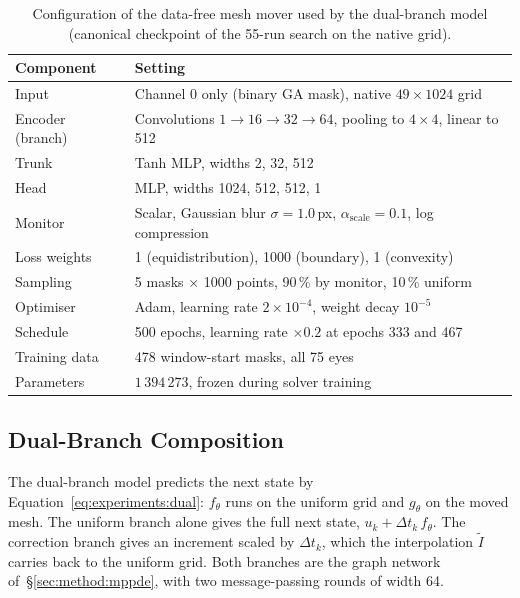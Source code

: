 \begin{table}[t]
  \centering
  \caption[Configuration of the data-free mesh mover.]{%
    Configuration of the data-free mesh mover used by the dual-branch
    model (canonical checkpoint of the 55-run search on the native grid).}
  \label{tab:appendix:dmm-config}
  \small
  \begin{tabular}{l p{}}
    \toprule
    Component & Setting \\
    \midrule
    Input & Channel 0 only (binary GA mask), native $49 \times 1024$ grid \\
    Encoder (branch) & Convolutions $1 \to 16 \to 32 \to 64$, pooling to
      $4 \times 4$, linear to 512 \\
    Trunk & Tanh MLP, widths 2, 32, 512 \\
    Head & MLP, widths 1024, 512, 512, 1 \\
    Monitor & Scalar, Gaussian blur $\sigma = 1.0$\,px,
      $\alpha_{\text{scale}} = 0.1$, log compression \\
    Loss weights & 1 (equidistribution), 1000 (boundary), 1 (convexity) \\
    Sampling & 5 masks $\times$ 1000 points, 90\,\% by monitor,
      10\,\% uniform \\
    Optimiser & Adam, learning rate $2 \times 10^{-4}$, weight decay
      $10^{-5}$ \\
    Schedule & 500 epochs, learning rate $\times 0.2$ at epochs 333 and
      467 \\
    Training data & 478 window-start masks, all 75 eyes \\
    Parameters & $1\,394\,273$, frozen during solver training \\
    \bottomrule
  \end{tabular}
\end{table}

\subsection{Dual-Branch Composition}
\label{app:mm-pde:dual}

The dual-branch model predicts the next state by
Equation~\eqref{eq:experiments:dual}: $f_\theta$ runs on the uniform grid
and $g_\theta$ on the moved mesh. The uniform branch alone gives the full
next state, $u_k + \Delta t_k\, f_\theta$. The correction branch gives an
increment scaled by $\Delta t_k$, which the interpolation $\tilde I$
carries back to the uniform grid. Both branches are the graph network
of~\S\ref{sec:method:mppde}, with two message-passing rounds of width 64.

